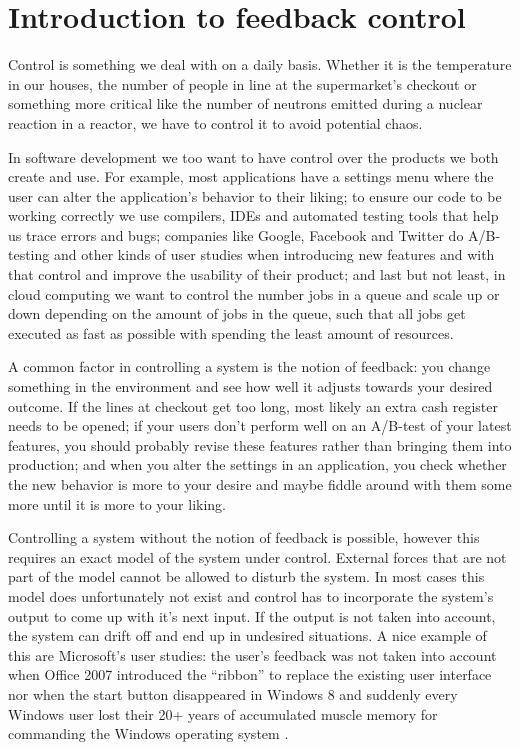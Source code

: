 \chapter{Introduction to feedback control}
\label{chap:intro-to-feedback-control}
Control is something we deal with on a daily basis. Whether it is the temperature in our houses, the number of people in line at the supermarket's checkout or something more critical like the number of neutrons emitted during a nuclear reaction in a reactor, we have to control it to avoid potential chaos.

In software development we too want to have control over the products we both create and use. For example, most applications have a settings menu where the user can alter the application's behavior to their liking; to ensure our code to be working correctly we use compilers, IDEs and automated testing tools that help us trace errors and bugs; companies like Google, Facebook and Twitter do A/B-testing and other kinds of user studies when introducing new features and with that control and improve the usability of their product; and last but not least, in cloud computing we want to control the number jobs in a queue and scale up or down depending on the amount of jobs in the queue, such that all jobs get executed as fast as possible with spending the least amount of resources.

A common factor in controlling a system is the notion of feedback: you change something in the environment and see how well it adjusts towards your desired outcome. If the lines at checkout get too long, most likely an extra cash register needs to be opened; if your users don't perform well on an A/B-test of your latest features, you should probably revise these features rather than bringing them into production; and when you alter the settings in an application, you check whether the new behavior is more to your desire and maybe fiddle around with them some more until it is more to your liking.

Controlling a system without the notion of feedback is possible, however this requires an exact model of the system under control. External forces that are not part of the model cannot be allowed to disturb the system. In most cases this model does unfortunately not exist and control has to incorporate the system's output to come up with it's next input. If the output is not taken into account, the system can drift off and end up in undesired situations. A nice example of this are Microsoft's user studies: the user's feedback was not taken into account when Office 2007 introduced the ``ribbon'' to replace the existing user interface nor when the start button disappeared in Windows 8 and suddenly every Windows user lost their 20+ years of accumulated muscle memory for commanding the Windows operating system \cite{meijer2014-embracing-the-hacker-way}.


